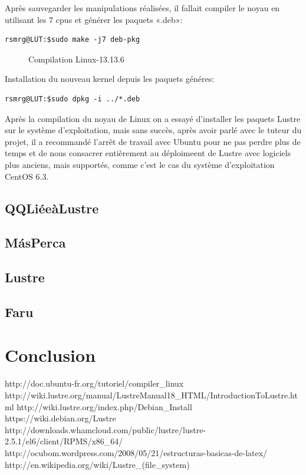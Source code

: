 \documentclass[12pt]{article}
\begin{document}
Après sauvegarder les manipulations réalisées, il fallait compiler le noyau en utilisant les 7 cpus et générer les paquets «.deb»:

\begin{verbatim}
rsmrg@LUT:$sudo make -j7 deb-pkg
\end{verbatim}

\begin{figure}[Compilation]
\caption{Compilation Linux-13.13.6}
\label{kernel}
\end{figure}

Installation du nouveau kernel depuis les paquets généres:

\begin{verbatim}
rsmrg@LUT:$sudo dpkg -i ../*.deb
\end{verbatim}

Après la compilation du noyau de Linux on a essayé d'installer les paquets Lustre sur le système d'exploitation, mais sans succès, après avoir parlé avec le tuteur du projet, il a recommandé l'arrêt de travail avec Ubuntu pour  ne pas perdre plus de temps et de nous consacrer entièrement au déploimeent de Lustre avec logiciels plus anciens, mais supportés, comme c'est le cas du système d'exploitation CentOS 6.3.

\newpage
\subsection{QQLiéeàLustre}
\subsection{MásPerca}
\subsection{Lustre}
\subsection{Faru}
\section{Conclusion}

http://doc.ubuntu-fr.org/tutoriel/compiler\_linux 
http://wiki.lustre.org/manual/LustreManual18\_HTML/IntroductionToLustre.html
http://wiki.lustre.org/index.php/Debian\_Install
https://wiki.debian.org/Lustre
http://downloads.whamcloud.com/public/lustre/lustre-2.5.1/el6/client/RPMS/x86\_64/
http://ocubom.wordpress.com/2008/05/21/estructuras-basicas-de-latex/
http://en.wikipedia.org/wiki/Lustre\_(file\_system)
\end{document}
